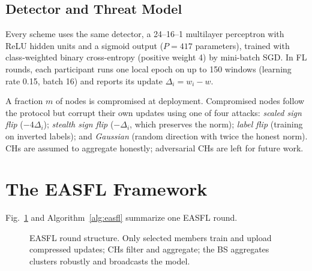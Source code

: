 \documentclass[journal]{IEEEtran}
\begin{document}
\subsection{Detector and Threat Model}
Every scheme uses the same detector, a 24--16--1 multilayer perceptron with ReLU hidden units and a sigmoid output ($P=417$ parameters), trained with class-weighted binary cross-entropy (positive weight 4) by mini-batch SGD. In FL rounds, each participant runs one local epoch on up to 150 windows (learning rate 0.15, batch 16) and reports its update $\Delta_i=w_i-w$.

A fraction $m$ of nodes is compromised at deployment. Compromised nodes follow the protocol but corrupt their own updates using one of four attacks: \emph{scaled sign flip} ($-4\Delta_i$); \emph{stealth sign flip} ($-\Delta_i$, which preserves the norm); \emph{label flip} (training on inverted labels); and \emph{Gaussian} (random direction with twice the honest norm). CHs are assumed to aggregate honestly; adversarial CHs are left for future work.

\section{The EASFL Framework}\label{sec:method}
Fig.~\ref{fig:arch} and Algorithm~\ref{alg:easfl} summarize one EASFL round.

\begin{figure}[t]
\centering
{}
\caption{EASFL round structure. Only selected members train and upload compressed updates; CHs filter and aggregate; the BS aggregates clusters robustly and broadcasts the model.}
\label{fig:arch}
\end{figure}
\end{document}

